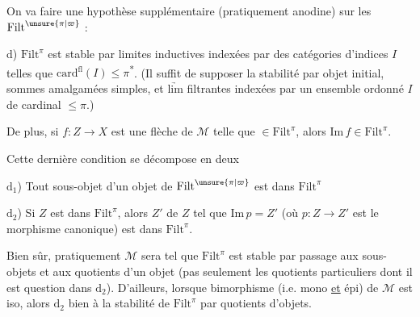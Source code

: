 
On va faire une hypothèse supplémentaire
(pratiquement anodine) sur les
$\mathrm{Filt}^{\unsure{\pi|\varpi}}$\deleted{\unsure{,}} :

d) $\mathrm{Filt}^{\pi}$ est stable par limites inductives
indexées par des catégories d'indices $I$
telles que $\mathrm{card}^{\mathrm{fl}}(I)\leq\pi$\textsuperscript{*}. (Il suffit de
supposer la stabilité par objet initial, sommes
amalgamées simples, et $\underrightarrow{\mathrm{lim}}$ filtrantes indexées
par un ensemble ordonné $I$ de cardinal $\leq\pi$.)

De plus, si $f:Z\longrightarrow X$ est une flèche
de $\mathcal M$ telle que   $\in\mathrm{Filt}^{\pi}$, alors $\mathrm{Im}\,f\in\mathrm{Filt}^{\pi}$.

Cette dernière condition  
 se décompose en
deux


$\mathrm d_1$) Tout sous-objet d'un objet de $\mathrm{Filt}^{\unsure{\pi|\varpi}}$ est dans $\mathrm{Filt}^{\pi}$

$\mathrm d_2$) Si $Z$ est dans $\mathrm{Filt}^{\pi}$, alors 
$Z'$ de $Z$ tel que  $\mathrm{Im}\,p=Z'$ (où
$p:Z\to Z'$ est le morphisme canonique)
est dans $\mathrm{Filt}^{\pi}$.


Bien sûr,  pratiquement $\mathcal M$ sera
tel que $\mathrm{Filt}^{\pi}$ est stable par
passage aux sous-objets  et aux
quotients d'un objet (pas seulement les
quotients particuliers dont il est question
dans $\mathrm d_2$). D'ailleurs, lorsque 
bimorphisme (i.e. mono \uline{et} épi) de $\mathcal M$
est iso, alors $\mathrm d_2$   bien à la
stabilité de $\mathrm{Filt}^{\pi}$ par quotients d'objets.

